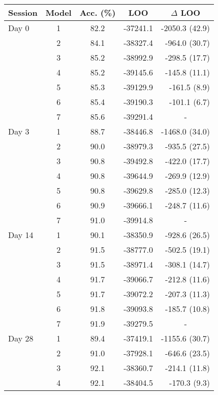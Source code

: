 \documentclass[a4paper,12pt]{article}
\begin{document}
\begin{refsection}[supp]
\begin{table}[h!]
    \centering
    \small
    \begin{tabular}{lcccr}
        \toprule
        Session & Model & Acc. (\%) & LOO & \multicolumn{1}{c}{$\Delta$ LOO} \\
        \midrule
         Day 0 & 1 & 82.2 & -37241.1 & -2050.3 (42.9) \\
         & 2 & 84.1 & -38327.4 & -964.0 (30.7) \\
         & 3 & 85.2 & -38992.9 & -298.5 (17.7) \\
         & 4 & 85.2 & -39145.6 & -145.8 (11.1) \\
         & 5 & 85.3 & -39129.9 & -161.5 (8.9) \\
         & 6 & 85.4 & -39190.3 & -101.1 (6.7) \\
         & 7 & 85.6 & -39291.4 & \multicolumn{1}{c}{-} \\
         \midrule
         Day 3 & 1 & 88.7 & -38446.8 & -1468.0 (34.0) \\
         & 2 & 90.0 & -38979.3 & -935.5 (27.5) \\
         & 3 & 90.8 & -39492.8 & -422.0 (17.7) \\
         & 4 & 90.8 & -39644.9 & -269.9 (12.9) \\
         & 5 & 90.8 & -39629.8 & -285.0 (12.3) \\
         & 6 & 90.9 & -39666.1 & -248.7 (11.6) \\
         & 7 & 91.0 & -39914.8 & \multicolumn{1}{c}{-} \\
         \midrule
         Day 14 & 1 & 90.1 & -38350.9 & -928.6 (26.5) \\
         & 2 & 91.5 & -38777.0 & -502.5 (19.1) \\
         & 3 & 91.5 & -38971.4 & -308.1 (14.7) \\
         & 4 & 91.7 & -39066.7 & -212.8 (11.6) \\
         & 5 & 91.7 & -39072.2 & -207.3 (11.3) \\
         & 6 & 91.8 & -39093.8 & -185.7 (10.8) \\
         & 7 & 91.9 & -39279.5 & \multicolumn{1}{c}{-} \\
         \midrule
         Day 28 & 1 & 89.4 & -37419.1 & -1155.6 (30.7) \\
         & 2 & 91.0 & -37928.1 & -646.6 (23.5) \\
         & 3 & 92.1 & -38360.7 & -214.1 (11.8) \\
         & 4 & 92.1 & -38404.5 & -170.3 (9.3) \\

\end{tabular}
\end{table}
\end{refsection}
\end{document}
